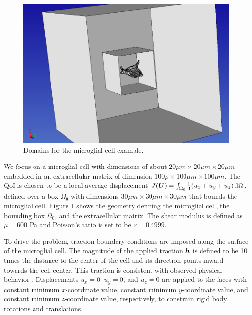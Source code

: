 %
\begin{figure}[ht!]
\centering
\includegraphics[width=.5\linewidth]{img/aut_glial_geom.png}
\caption{Domains for the microglial cell example.}
\label{fig:aut_glial_geom}
\end{figure}

We focus on a microglial cell with dimensions of about
$20 \mu m \times 20 \mu m \times 20 \mu m$ embedded in an extracellular
matrix of dimension $100 \mu \times 100 \mu m \times 100 \mu m$.
The QoI is chosen to be a local average displacement
$J(\boldsymbol{U}) = \int_{\Omega_0} \frac13 (u_x + u_y + u_z) \, \text{d} \Omega$,
defined over a box $\Omega_0$ with dimensions
$30 \mu m \times 30 \mu m \times 30 \mu m$
that bounds the microglial cell. Figure \ref{fig:aut_glial_geom} shows
the geometry defining the microglial cell, the bounding box
$\Omega_0$, and the extracellular matrix. The shear modulus
is defined as $\mu = 600$ Pa and Poisson's ratio is set to be
$\nu = 0.4999$.

To drive the problem, traction boundary conditions are imposed along
the surface of the microglial cell. The magnitude of the applied
traction $\boldsymbol{h}$ is defined to be 10 times the distance to the
center of the cell and its direction points inward towards the
cell center. This traction is consistent with observed physical
behavior \cite{dong2017recovery}. Displacements $u_x = 0$,
$u_y=0$, and $u_z=0$ are applied to the faces with constant
minimum $x$-coordinate value, constant minimum $y$-coordinate
value, and constant minimum $z$-coordinate value, respectively,
to constrain rigid body rotations and translations.

